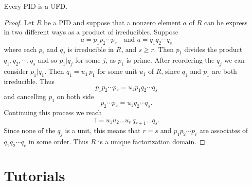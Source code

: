 \begin{theorem}
    Every PID is a UFD.
\end{theorem}
\begin{proof}
    Let $R$ be a PID and suppose that a nonzero element $a$ of $R$ can be express in two different ways 
    as a product of irreducibles. Suppose
    \[
        a = p_1 p_2 \cdots p_r \quad \text{and } a = q_1 q_2 \cdots q_s 
    \]
    where each $p_i$ and $q_j$ is irreducible in $R$, and $s \geq r$. Then $p_1$ divides the 
    product $q_1, q_2, \cdots, q_s $ and so $p_1 | q_j$ for some $j$, as $p_1$ is prime. 
    After reordering the $q_j$ we can consider $p_1|q_1$. Then $q_1 = u_1\, p_1$ for some unit $u_1$ of $R$,
    since $q_1$ and $p_1$ are both irreducible. Thus
    \[
        p_1 p_2 \cdots p_r = u_1 p_1 q_2 \cdots q_s
    \]
    and cancelling $p_1$ on both side
    \[
        p_2 \cdots p_r = u_1 q_2 \cdots q_s.
    \]
    Continuing this process we reach
    \[
        1 = u_1 u_2 \ldots u_r\, q_{r+1} \ldots q_s.
    \]
    Since none of the $q_j$ is a unit, this means that $r=s$ and $p_1 p_2 \cdots p_r$ are associates of 
    $q_1 q_2 \cdots q_r$ in some order. Thus $R$ is a unique factorization domain.
\end{proof}

\section*{Tutorials}

